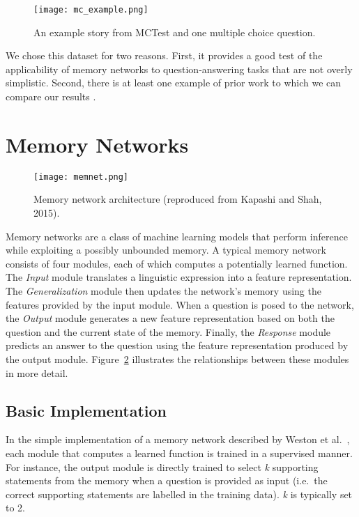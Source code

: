 \documentclass[10pt]{article}
\begin{document}
\begin{figure}[b]
\centering
	\texttt{[image: mc\_example.png]}
    \caption{An example story from MCTest and one multiple choice 
        question.}\label{fig:story}
\end{figure}

We chose this dataset for two reasons. First, it provides a good test of the applicability of memory networks to question-answering tasks that are not overly simplistic. Second, there is at least one example of prior work to which we can compare our results \cite{Darshan:2015}.  


\section{Memory Networks}

\begin{figure}
\centering
	\texttt{[image: memnet.png]}
	\caption{Memory network architecture (reproduced from Kapashi and Shah, 
        2015).}\label{fig:memnet}
\end{figure}

Memory networks are a class of machine learning models that perform inference 
while exploiting a possibly unbounded memory. A typical memory network consists 
of four modules, each of which computes a potentially learned function. The 
\textit{Input} module translates a linguistic expression into a feature 
representation. The \textit{Generalization} module then updates the network's 
memory using the features provided by the input module. When a question is posed 
to the network, the \textit{Output} module generates a new feature 
representation based on both the question and the current state of the memory. 
Finally, the \textit{Response} module predicts an answer to the question using 
the feature representation produced by the output module.  
Figure~\ref{fig:memnet} illustrates the relationships between these modules in 
more detail.


\subsection{Basic Implementation}

In the simple implementation of a memory network described by Weston  et al.~\cite{Weston:2015a}, each module that computes a learned function is trained in a supervised manner. For instance, the output module is directly trained to select \textit{k} supporting statements from the memory when a question is provided as input (i.e.~the correct supporting statements are labelled in the training data). \textit{k} is typically set to 2. 
\end{document}
